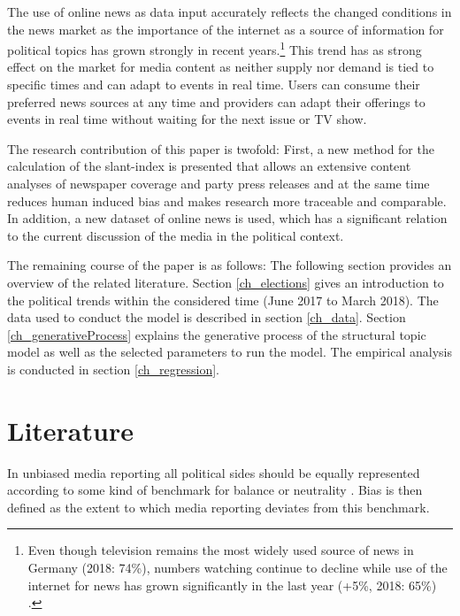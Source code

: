 \documentclass[12pt,a4paper,notitlepage]{article}
\begin{document}
The use of online news as data input accurately reflects the changed conditions in the news market as the importance of the internet as a source of information for political topics has grown strongly in recent years.\footnote{Even though television remains the most widely used source of news in Germany (2018: 74\%), numbers watching continue to decline while use of the internet for news has grown significantly in the last year (+5\%, 2018: 65\%) \citep{holig_reuters_2018}.} This trend has as strong effect on the market for media content as neither supply nor demand is tied to specific times and can adapt to events in real time. Users can consume their preferred news sources at any time and providers can adapt their offerings to events in real time without waiting for the next issue or TV show.

The research contribution of this paper is twofold: First, a new method for the calculation of the slant-index is presented that allows an extensive content analyses of newspaper coverage and party press releases and at the same time reduces human induced bias and makes research more traceable and comparable. In addition, a new dataset of online news is used, which has a significant relation to the current discussion of the media in the political context. 

The remaining course of the paper is as follows: The following section provides an overview of the related literature. Section \ref{ch_elections} gives an introduction to the political trends within the considered time (June 2017 to March 2018). The data used to conduct the model is described in section \ref{ch_data}. Section \ref{ch_generativeProcess} explains the generative process of the structural topic model as well as the selected parameters to run the model. The empirical analysis is conducted in section \ref{ch_regression}. 


\section{Literature}

In unbiased media reporting all political sides should be equally represented according to some kind of benchmark for balance or neutrality \citep{hopmann_political_2012}. Bias is then defined as the extent to which media reporting deviates from this benchmark.
\end{document}
